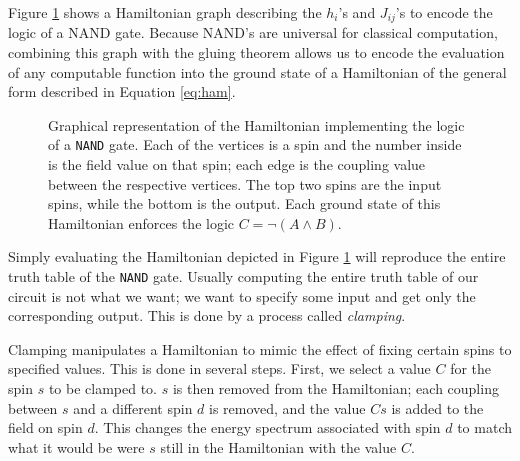 Figure \ref{fig:nand_graph} shows a Hamiltonian graph describing the $h_i$'s and $J_{ij}$'s to encode the logic of a NAND gate.  Because NAND's are universal for classical computation, combining this graph with the gluing theorem allows us to encode the evaluation of any computable function into the ground state of a Hamiltonian of the general form described in Equation \ref{eq:ham}.

\begin{figure}
	\begin{center}
\end{center}
	\caption[\texttt{NAND} Graph]{Graphical representation of the Hamiltonian implementing the logic of a \texttt{NAND} gate.  Each of the vertices is a spin and the number inside is the field value on that spin; each edge is the coupling value between the respective vertices.  The top two spins are the input spins, while the bottom is the output.  Each ground state of this Hamiltonian enforces the logic $C = \neg(A \wedge B)$.}
	\label{fig:nand_graph}
\end{figure}

Simply evaluating the Hamiltonian depicted in Figure \ref{fig:nand_graph} will reproduce the entire truth table of the \texttt{NAND} gate.  Usually computing the entire truth table of our circuit is not what we want; we want to specify some input and get only the corresponding output.  This is done by a process called \emph{clamping}.  

Clamping manipulates a Hamiltonian to mimic the effect of fixing certain spins to specified values.  This is done in several steps.  First, we select a value $C$ for the spin $s$ to be clamped to.  $s$ is then removed from the Hamiltonian; each coupling between $s$ and a different spin $d$ is removed, and the value $Cs$ is added to the field on spin $d$.  This changes the energy spectrum associated with spin $d$ to match what it would be were $s$ still in the Hamiltonian with the value $C$.

